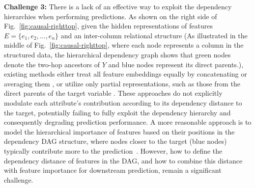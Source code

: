 \documentclass[conference]{IEEEtran}
\newcommand{\done}[1]{{\color{black}#1}}
\newcommand{\rem}[1]{{\color{black}#1}}
\newcommand{\vldb}[1]{{\color{black}#1}}
\newcommand{\syic}[1]{{\color{black}#1}}
\begin{document}
\textbf{Challenge 3:}
\syic{
There is a lack of an effective way to exploit the dependency hierarchies when 
performing predictions.
}
As shown on the right side of Fig.~\ref{fig:causal-righttop},
given the hidden representations of features $E = \{e_1, e_2, \dots, e_n\}$ and an inter-column relational structure \rem{
(As illustrated in the middle of Fig.~\ref{fig:causal-righttop}, where each node represents a column in the structured data, the hierarchical \syic{dependency} graph shows that green nodes denote the two-hop ancestors of $Y$ and blue nodes represent its direct parents.)},
existing methods either treat all feature embeddings equally by concatenating or averaging them \cite{r:tab}, 
or utilize only partial representations, such as those from the direct parents of the target variable \cite{r:CASTLE}.
\syic{These approaches do not explicitly modulate each attribute's contribution according to its dependency distance to the target, potentially failing to fully exploit the dependency hierarchy and consequently degrading prediction performance.}
A more reasonable approach is to model the hierarchical importance of features based on their positions in the \syic{dependency} DAG structure, where nodes closer to the target \done{(blue nodes)} typically contribute more to the prediction\vldb{~\cite{r:dagsum}.}
\syic{However, how to define the dependency distance of features in the DAG, and how to combine this distance with feature importance for downstream prediction, remain a significant challenge.}
\end{document}
